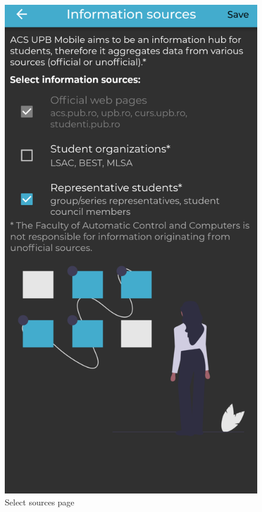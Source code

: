 \begin{figure}[!ht]
\begin{minipage}[b]{0.32\textwidth}
    \end{minipage}
    \hfill
    \begin{minipage}[b]{0.32\textwidth}
        \captionsetup{justification=centering}
        \includegraphics[width=\textwidth]{figures/app/final/select-sources-final.png}
        \caption{Select sources page}
        \label{4:fig:select_sources_page}

\end{minipage}
\end{figure}
